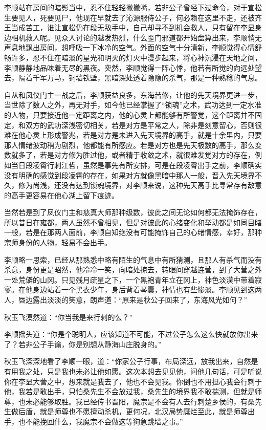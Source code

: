 李顺站在房间的暗影当中，忍不住轻轻撇撇嘴，若非公子曾经下过命令，对于宣松生要见人，死要见尸，他现在早就去了沁源服侍公子，何必赖在这里不走，还被齐王当成苦工，谁让宣松仍在段无敌手中，自己却寻不到机会救人，只有留在李显身边相机救人呢。见众人讨论的越发热烈，什么歪门邪道都开始盘算出来，李顺悄无声息地飘出房间，想呼吸一下冰冷的空气。外面的空气十分清新，李顺觉得心情舒畅许多，忍不住在暗淡的星光和明灭的灯火中漫步起来，将心神沉浸在天地之间，李顺静静地品味着无尽的黑夜。突然，李顺觉得一阵心悸，他若有所觉的向远处望去，隔着千军万马，铜墙铁壁，黑暗深处透着隐隐的杀气，那是一种熟稔的气息。

自从和凤仪门主一战之后，李顺获益良多，东海苦修，让他的先天境界更进一步，当世除了数人之外，再无对手，如今他已经掌握了“锁魂”之术，武功达到一定水准的人物，只要接近他一定距离之内，他的心灵上都能够有所警觉，这个距离并不固定，和双方的武功深浅密切相关，若是对方是平常之人，除非是刻意留心，否则很难在他心灵上形成警兆，若是对方是未进入先天境界的高手，就是十余里内，只要那人情绪波动稍为剧烈，他都能有所感应。若是对方也是先天极数的高手，那么变数就多了，若是对方修为胜过他，或者精于收敛之术，就很难发觉对方的存在，例如当日段凌霄行刺江哲，虽然是事先有所安排，可是在段凌霄出手之前，李顺确实没有明确的感觉到段凌霄的存在，如果对方就像黑暗中那人一般，晋入先天境界不久，修为尚浅，还没有达到锁魂境界，对李顺来说，这种先天高手比寻常存有敌意的高手更容易在他心湖上留下痕迹。

当然若是到了凤仪门主和慈真大师那种级数，彼此之间无论如何都无法掩饰存在，所以昔日在雍都，两人虽然不曾相见，但是对彼此的心绪变化和举动都是如同目睹一般，若是在那两人面前，李顺自知绝没有可能掩饰自己的心绪情感，幸好，那种宗师身份的人物，轻易不会出手。

李顺略一思索，已经从那熟悉中略有陌生的气息中有所猜测，且那人有杀气而没有杀意，身份更是昭然，他冷冷一笑，向暗处掠去，转眼间穿越连营，到了大营之外一处荒僻的山冈。只见残月疏星之下，一个黑袍青年立在冈上，神色淡漠中带着寂寥。在他身边站着一个黑衣少年，身后背着琴囊，神情也有些惨淡。李顺见到这两人，唇边露出淡淡的笑意，朗声道：“原来是秋公子回来了，东海风光如何？”

秋玉飞漠然道：“你当我是来行刺的么？”

李顺摇头道：“你是个聪明人，应该知道不可能，不过公子怎么这么快就放你出来了？若非公子手谕，你是别想从静海山庄脱身的。”

秋玉飞深深地看了李顺一眼，道：“你家公子行事，布局深远，放我出来，自然是有用我之处，只是我也未必让他如愿。这次本想去见见他，问他几句话，可是听说你在李显大营之中，想来就是我去了，他也不会见我。你倒也不用担心我会行刺于他，我若是敢出手，只怕桑先生不会放过我，桑先生的境界我不敢揣测，但就是师尊，也未必能够取胜。我已经传书晋阳，魔宗是不会有人去行刺楚乡侯的，有桑先生做后盾，就是师尊也不愿擅动杀机，更何况，北汉局势糜烂至此，就是师尊出手，也不能挽回什么，我魔宗不会做这等狗急跳墙之事。”

